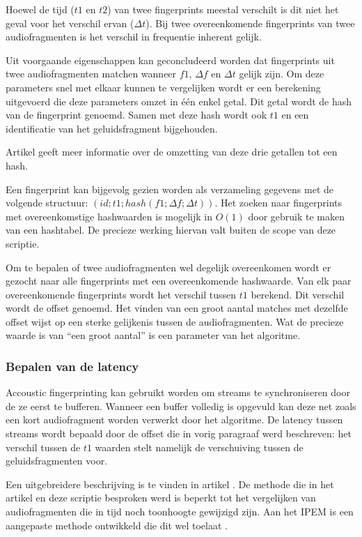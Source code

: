Hoewel de tijd ($t1$ en $t2$) van twee fingerprints meestal verschilt is dit niet het geval voor het verschil ervan ($\Delta t$). Bij twee overeenkomende fingerprints van twee audiofragmenten is het verschil in frequentie inherent gelijk.

Uit voorgaande eigenschappen kan geconcludeerd worden dat fingerprints uit twee audiofragmenten matchen wanneer $ f1 $, $ \Delta f $ en $ \Delta t $ gelijk zijn. Om deze parameters snel met elkaar kunnen te vergelijken wordt er een berekening uitgevoerd die deze parameters omzet in één enkel getal. Dit getal wordt de hash van de fingerprint genoemd. Samen met deze hash wordt ook $ t1 $ en een identificatie van het geluidsfragment bijgehouden.

Artikel \cite{six2014panako} geeft meer informatie over de omzetting van deze drie getallen tot een hash.

Een fingerprint kan bijgevolg gezien worden als verzameling gegevens met de volgende structuur: $ ( id; t1; hash(f1; \Delta f; \Delta t) ) $. Het zoeken naar fingerprints met overeenkomstige hashwaarden is mogelijk in $O(1)$ door gebruik te maken van een hashtabel. De precieze werking hiervan valt buiten de scope van deze scriptie.

Om te bepalen of twee audiofragmenten wel degelijk overeenkomen wordt er gezocht naar alle fingerprints met een overeenkomende hashwaarde. Van elk paar overeenkomende fingerprints wordt het verschil tussen $ t1 $ berekend. Dit verschil wordt de offset genoemd. Het vinden van een groot aantal matches met dezelfde offset wijst op een sterke gelijkenis tussen de audiofragmenten. Wat de precieze waarde is van ``een groot aantal'' is een parameter van het algoritme.

\subsubsection{Bepalen van de latency}

Accoustic fingerprinting kan gebruikt worden om streams te synchroniseren door de ze eerst te bufferen. Wanneer een buffer volledig is opgevuld kan deze net zoals een kort audiofragment worden verwerkt door het algoritme. De latency tussen streams wordt bepaald door de offset die in vorig paragraaf werd beschreven: het verschil tussen de $ t1 $ waarden stelt namelijk de verschuiving tussen de geluidsfragmenten voor.

Een uitgebreidere beschrijving is te vinden in artikel \cite{Wang2003a}. De methode die in het artikel en deze scriptie besproken werd is beperkt tot het vergelijken van audiofragmenten die in tijd noch toonhoogte gewijzigd zijn. Aan het IPEM is een aangepaste methode ontwikkeld die dit wel toelaat \cite{six2014panako}.

